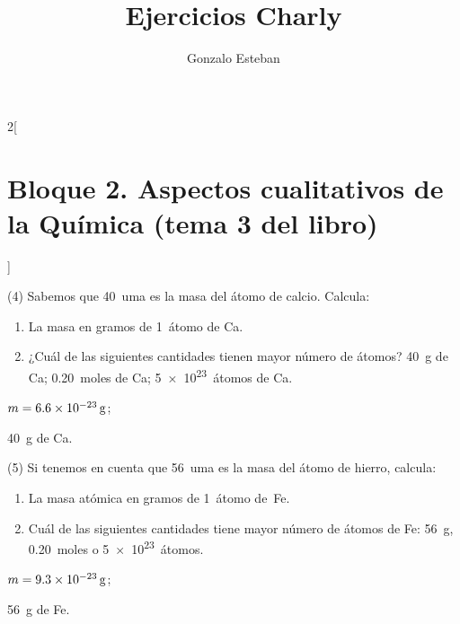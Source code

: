 \documentclass[10pt]{article}
\title{Ejercicios Charly}
\author{Gonzalo Esteban}
\begin{document}
\maketitle


\begin{multicols}{2}[
    \section{Bloque 2. Aspectos cualitativos de la Química (tema 3 del libro)}
  ]

\begin{exercise}[
    tags    = {},
    topics  = {química,química básica},
    source  = {FQ 1B MGH 2016, p66, e4},
  ]
  (4) Sabemos que \SI{40}{uma} es la masa del átomo de calcio. Calcula:

  \begin{enumerate}
    \item La masa en gramos de \SI{1}{átomo} de Ca.
    \item ¿Cuál de las siguientes cantidades tienen mayor número de átomos? \SI{40}{g} de Ca; \SI{0,20}{moles} de Ca; \SI{5e23}{átomos} de Ca.
  \end{enumerate}
\end{exercise}

\begin{solution}
  \begin{enumerate*}
    \item \( m = \SI{6,6E-23}{\gram} \);
    \item \SI{40}{\gram} de Ca.
  \end{enumerate*}
\end{solution}




\begin{exercise}[
    tags    = {},
    topics  = {química,química básica},
    source  = {FQ 1B MGH 2016, p66, e5},
  ]
  (5) Si tenemos en cuenta que \SI{56}{uma} es la masa del átomo de hierro, calcula:
  \begin{enumerate}
    \item La masa atómica en gramos de \SI{1}{átomo} de~Fe.
    \item Cuál de las siguientes cantidades tiene mayor número de átomos de Fe: \SI{56}{\gram}, \SI{0,20}{moles} o \SI{5e23}{átomos}.
  \end{enumerate}
\end{exercise}

\begin{solution}
  \begin{enumerate*}
    \item \( m = \SI{9,3E-23}{\gram} \);
    \item \SI{56}{\gram} de Fe.
  \end{enumerate*}
\end{solution}





\end{multicols}
\end{document}
